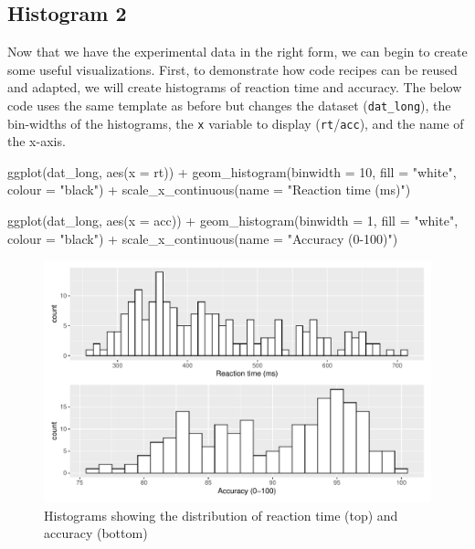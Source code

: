 \documentclass[
  english,
  doc,floatsintext]{apa6}
\newenvironment{Shaded}{\begin{snugshade}}{\end{snugshade}}
\newcommand{\AttributeTok}[1]{\textcolor[rgb]{0.77,0.63,0.00}{#1}}
\newcommand{\DecValTok}[1]{\textcolor[rgb]{0.00,0.00,0.81}{#1}}
\newcommand{\FunctionTok}[1]{\textcolor[rgb]{0.00,0.00,0.00}{#1}}
\newcommand{\NormalTok}[1]{#1}
\newcommand{\SpecialCharTok}[1]{\textcolor[rgb]{0.00,0.00,0.00}{#1}}
\newcommand{\StringTok}[1]{\textcolor[rgb]{0.31,0.60,0.02}{#1}}
\begin{document}
\hypertarget{histogram-2}{%
\subsection{Histogram 2}\label{histogram-2}}

Now that we have the experimental data in the right form, we can begin to create some useful visualizations. First, to demonstrate how code recipes can be reused and adapted, we will create histograms of reaction time and accuracy. The below code uses the same template as before but changes the dataset (\texttt{dat\_long}), the bin-widths of the histograms, the \texttt{x} variable to display (\texttt{rt}/\texttt{acc}), and the name of the x-axis.

\begin{Shaded}
\begin{Highlighting}[]
\FunctionTok{ggplot}\NormalTok{(dat\_long, }\FunctionTok{aes}\NormalTok{(}\AttributeTok{x =}\NormalTok{ rt)) }\SpecialCharTok{+}
  \FunctionTok{geom\_histogram}\NormalTok{(}\AttributeTok{binwidth =} \DecValTok{10}\NormalTok{, }\AttributeTok{fill =} \StringTok{"white"}\NormalTok{, }\AttributeTok{colour =} \StringTok{"black"}\NormalTok{) }\SpecialCharTok{+}
  \FunctionTok{scale\_x\_continuous}\NormalTok{(}\AttributeTok{name =} \StringTok{"Reaction time (ms)"}\NormalTok{)}

\FunctionTok{ggplot}\NormalTok{(dat\_long, }\FunctionTok{aes}\NormalTok{(}\AttributeTok{x =}\NormalTok{ acc)) }\SpecialCharTok{+}
  \FunctionTok{geom\_histogram}\NormalTok{(}\AttributeTok{binwidth =} \DecValTok{1}\NormalTok{, }\AttributeTok{fill =} \StringTok{"white"}\NormalTok{, }\AttributeTok{colour =} \StringTok{"black"}\NormalTok{) }\SpecialCharTok{+}
  \FunctionTok{scale\_x\_continuous}\NormalTok{(}\AttributeTok{name =} \StringTok{"Accuracy (0{-}100)"}\NormalTok{)}
\end{Highlighting}
\end{Shaded}

\begin{figure}

{\centering \includegraphics[width=1\linewidth]{images/histograms-1} 

}

\caption{Histograms showing the distribution of reaction time (top) and accuracy (bottom)}\label{fig:histograms}
\end{figure}
\end{document}
